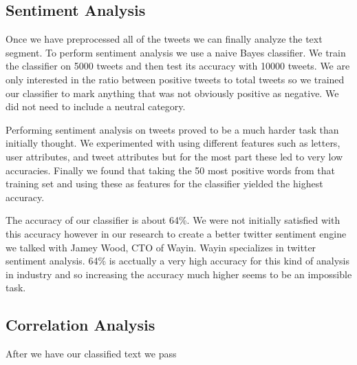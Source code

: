 \documentclass{acm_proc_article-sp}
\begin{document}
\subsection{Sentiment Analysis}

Once we have preprocessed all of the tweets we can finally analyze the text
segment. To perform sentiment analysis we use a naive Bayes classifier. We
train the classifier on 5000 tweets and then test its accuracy with 10000
tweets.  We are only interested in the ratio between positive tweets to total
tweets so we trained our classifier to mark anything that was not obviously
positive as negative. We did not need to include a neutral category. 

Performing sentiment analysis on tweets proved to be a much harder task than
initially thought. We experimented with using different features such as
letters, user attributes, and tweet attributes but for the most part these led
to very low accuracies. Finally we found that taking the 50 most positive words
from that training set and using these as features for the classifier yielded
the highest accuracy. 

The accuracy of our classifier is about 64\%. We were
not initially satisfied with this accuracy however in our research to create a
better twitter sentiment engine we talked with Jamey Wood, CTO of Wayin. Wayin
specializes in twitter sentiment analysis. 64\% is acctually a very high
accuracy for this kind of analysis in industry and so increasing the accuracy
much higher seems to be an impossible task.

\subsection{Correlation Analysis}

After we have our classified text we pass 
\end{document}
